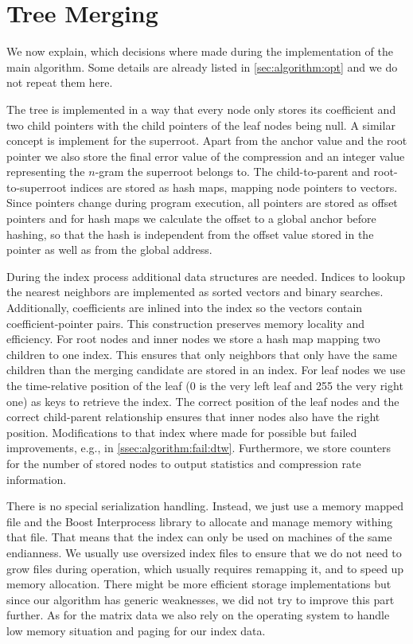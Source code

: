 \section{Tree Merging}
\label{sec:implementation:tree}

We now explain, which decisions where made during the implementation of the main algorithm. Some details are already listed in \autoref{sec:algorithm:opt} and we do not repeat them here.

The tree is implemented in a way that every node only stores its coefficient and two child pointers with the child pointers of the leaf nodes being null. A similar concept is implement for the superroot. Apart from the anchor value and the root pointer we also store the final error value of the compression and an integer value representing the $n$-gram the superroot belongs to. The child-to-parent and root-to-superroot indices are stored as hash maps, mapping node pointers to vectors. Since pointers change during program execution, all pointers are stored as offset pointers and for hash maps we calculate the offset to a global anchor before hashing, so that the hash is independent from the offset value stored in the pointer as well as from the global address.

During the index process additional data structures are needed. Indices to lookup the nearest neighbors are implemented as sorted vectors and binary searches. Additionally, coefficients are inlined into the index so the vectors contain coefficient-pointer pairs. This construction preserves memory locality and efficiency. For root nodes and inner nodes we store a hash map mapping two children to one index. This ensures that only neighbors that only have the same children than the merging candidate are stored in an index. For leaf nodes we use the time-relative position of the leaf (\num{0} is the very left leaf and \num{255} the very right one) as keys to retrieve the index. The correct position of the leaf nodes and the correct child-parent relationship ensures that inner nodes also have the right position. Modifications to that index where made for possible but failed improvements, e.g., in \autoref{ssec:algorithm:fail:dtw}. Furthermore, we store counters for the number of stored nodes to output statistics and compression rate information.

There is no special serialization handling. Instead, we just use a memory mapped file and the Boost Interprocess library to allocate and manage memory withing that file. That means that the index can only be used on machines of the same endianness. We usually use oversized index files to ensure that we do not need to grow files during operation, which usually requires remapping it, and to speed up memory allocation. There might be more efficient storage implementations but since our algorithm has generic weaknesses, we did not try to improve this part further. As for the matrix data we also rely on the operating system to handle low memory situation and paging for our index data.

